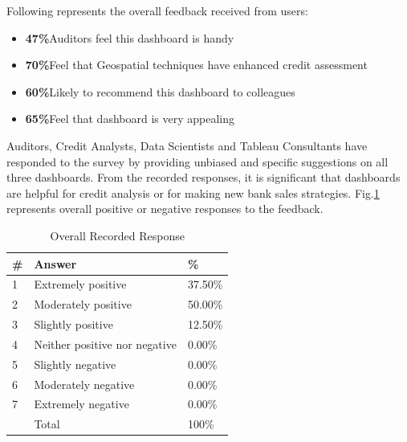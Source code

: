 Following represents the overall feedback received from users: 
\begin{itemize}
\item \textbf{47\%}Auditors feel this dashboard is handy
\item \textbf{70\%}Feel that Geospatial techniques have enhanced credit assessment
\item \textbf{60\%}Likely to recommend this dashboard to colleagues
\item \textbf{65\%}Feel that dashboard is very appealing
\end{itemize}

Auditors, Credit Analysts, Data Scientists and Tableau Consultants have responded to the survey by providing unbiased and specific suggestions on all three dashboards. From the recorded responses, it is significant that dashboards are helpful for credit analysis or for making new bank sales strategies. Fig.\ref{fig:feed} represents overall positive or negative responses to the feedback. \\

\begin{table}[!htb]
\centering
\caption{Overall Recorded Response}
\label{fig:feed}
\begin{tabular}{@{}lll@{}}
\toprule
\# & Answer                        & \%      \\ \midrule
1  & Extremely positive            & 37.50\% \\
2  & Moderately positive           & 50.00\% \\
3  & Slightly positive             & 12.50\% \\
4  & Neither positive nor negative & 0.00\%  \\
5  & Slightly negative             & 0.00\%  \\
6  & Moderately negative           & 0.00\%  \\
7  & Extremely negative            & 0.00\%  \\
   & Total                         & 100\%   \\ \bottomrule
\end{tabular}
\end{table}